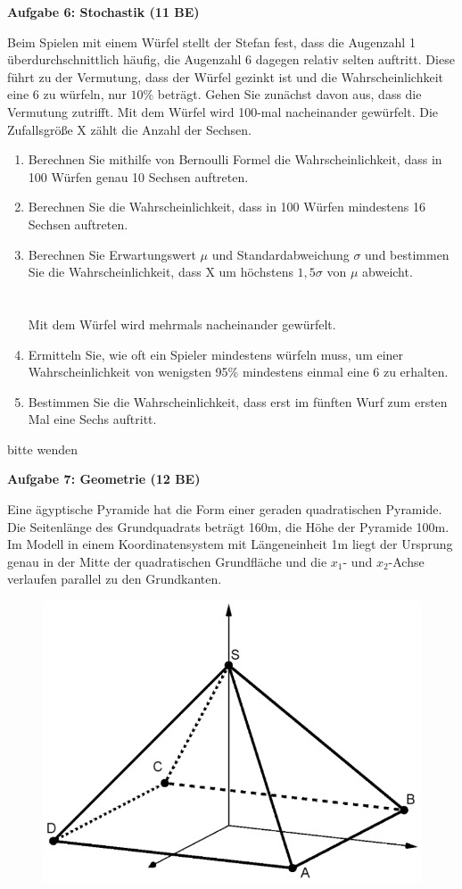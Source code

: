 \documentclass[a4paper,12pt]{article}
\newcommand{\Aufgabe}[1]{
  {
  \vspace*{0.5cm}
  \textsf{\textbf{Aufgabe #1}}
  \vspace*{0.2cm}
  
  }
}
\begin{document}
\Aufgabe{6: Stochastik (11 BE)}
Beim Spielen mit einem Würfel stellt der Stefan fest, dass die Augenzahl 1 überdurchschnittlich häufig, die Augenzahl 6 dagegen relativ selten auftritt. Diese führt zu der Vermutung, dass der Würfel gezinkt ist und die Wahrscheinlichkeit eine 6 zu würfeln, nur $10\%$ beträgt. Gehen Sie zunächst davon aus, dass die Vermutung zutrifft.
Mit dem Würfel wird 100-mal nacheinander gewürfelt. Die Zufallsgröße X zählt die Anzahl der Sechsen.
\begin{enumerate}[label={\alph*)}]


\item Berechnen Sie mithilfe von Bernoulli Formel  die Wahrscheinlichkeit, dass in 100 Würfen genau 10 Sechsen auftreten.
\item Berechnen Sie die Wahrscheinlichkeit, dass in 100 Würfen mindestens 16 Sechsen auftreten.
\item Berechnen Sie Erwartungswert $\mu$ und Standardabweichung $\sigma$ und bestimmen Sie die Wahrscheinlichkeit, dass X um höchstens $1,5 \sigma$ von $ \mu$ abweicht.\\
\\
\\
Mit dem Würfel wird mehrmals nacheinander gewürfelt.
\item Ermitteln Sie, wie oft ein Spieler mindestens würfeln muss, um einer Wahrscheinlichkeit von wenigsten 95\% mindestens einmal eine 6 zu erhalten.
\item Bestimmen Sie die Wahrscheinlichkeit, dass erst im fünften Wurf zum ersten Mal eine Sechs auftritt.
\end{enumerate}

\vspace{10cm} 
\begin{flushright}bitte wenden \end{flushright}


\newpage
\vspace*{-4\baselineskip}

\enlargethispage{1,5cm}
\Aufgabe{7: Geometrie (12 BE)}
Eine ägyptische Pyramide hat die Form einer geraden quadratischen Pyramide. Die Seitenlänge des Grundquadrats beträgt 160m, die Höhe der Pyramide 100m. Im Modell in einem Koordinatensystem mit Längeneinheit 1m liegt der Ursprung genau in der Mitte der quadratischen Grundfläche und die $x_1$- und $x_2$-Achse verlaufen parallel zu den Grundkanten. 

  \begin{figure}[H]
    \centering
    \includegraphics[width=0.5\columnwidth]{210227_pyramide.png}
  \end{figure}
\end{document}
